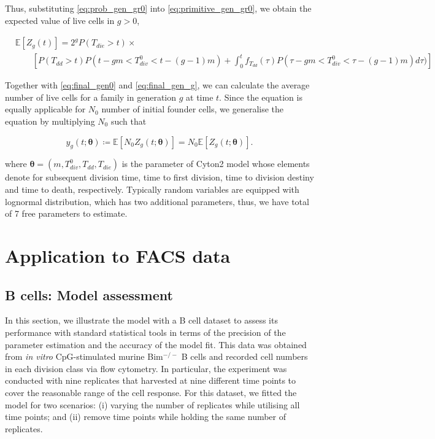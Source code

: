 \documentclass[11pt, a4paper]{article}
\begin{document}
Thus, substituting \cref{eq:prob_gen_gr0} into \cref{eq:primitive_gen_gr0}, we obtain the expected value of live cells in $g > 0$,
\begin{linenomath*}
    \begin{align}
        \label{eq:final_gen_g}
        & \mathbb{E}[Z_g(t)] = 2^g P(T_{die} > t) \times \nonumber \\
        & \qquad \left[P(T_{dd} > t) P(t - gm < T_{div}^0 < t - (g - 1)m) + \int_0^t f_{T_{dd}}(\tau) P(\tau - gm < T_{div}^0 < \tau - (g - 1)m) d\tau) \right]
    \end{align}
\end{linenomath*}
Together with \cref{eq:final_gen0} and \cref{eq:final_gen_g}, we can calculate the average number of live cells for a family in generation $g$ at time $t$. Since the equation is equally applicable for $N_0$ number of initial founder cells, we generalise the equation by multiplying $N_0$ such that
\begin{linenomath*}
    \begin{equation}
        \label{eq:final_expected_cell_number}
        y_g(t; \boldsymbol{\theta}) \coloneqq \mathbb{E}[N_0 Z_g(t;\boldsymbol{\theta})] = N_0 \mathbb{E}[Z_g(t;\boldsymbol{\theta})].
    \end{equation}
\end{linenomath*}
where $\boldsymbol{\theta} = (m, T_{div}^0, T_{dd}, T_{die})$ is the parameter of Cyton2 model whose elements denote for subsequent division time, time to first division, time to division destiny and time to death, respectively. Typically random variables are equipped with lognormal distribution, which has two additional parameters, thus, we have total of 7 free parameters to estimate.

\nolinenumbers
\section{Application to FACS data}
\subsection{B cells: Model assessment}
In this section, we illustrate the model with a B cell dataset to assess its performance with standard statistical tools in terms of the precision of the parameter estimation and the accuracy of the model fit. This data was obtained from \textit{in vitro} CpG-stimulated murine Bim$^{-/-}$ B cells and recorded cell numbers in each division class via flow cytometry. In particular, the experiment was conducted with nine replicates that harvested at nine different time points to cover the reasonable range of the cell response. For this dataset, we fitted the model for two scenarios: (i) varying the number of replicates while utilising all time points; and (ii) remove time points while holding the same number of replicates.
\end{document}
